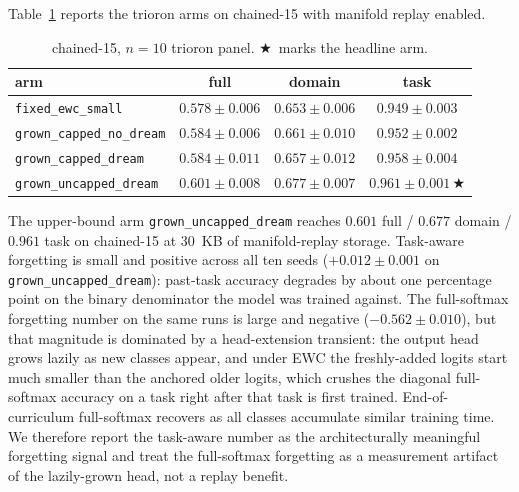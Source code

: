 \documentclass[11pt]{article}
\newcommand{\arm}[1]{\texttt{#1}}
\newcommand{\headline}{$\bigstar$}
\begin{document}
Table~\ref{tab:trioron-panel} reports the trioron arms on chained-15
with manifold replay enabled.

\begin{table}[h]
  \centering
  \caption{chained-15, $n = 10$ trioron panel.
           \headline\ marks the headline arm.}
  \label{tab:trioron-panel}
  \begin{tabular}{lccc}
    \toprule
    arm                              & full              & domain            & task              \\
    \midrule
    \arm{fixed\_ewc\_small}          & $0.578 \pm 0.006$ & $0.653 \pm 0.006$ & $0.949 \pm 0.003$ \\
    \arm{grown\_capped\_no\_dream}   & $0.584 \pm 0.006$ & $0.661 \pm 0.010$ & $0.952 \pm 0.002$ \\
    \arm{grown\_capped\_dream}       & $0.584 \pm 0.011$ & $0.657 \pm 0.012$ & $0.958 \pm 0.004$ \\
    \arm{grown\_uncapped\_dream}     & $0.601 \pm 0.008$ & $0.677 \pm 0.007$ & $0.961 \pm 0.001$\,\headline \\
    \bottomrule
  \end{tabular}
\end{table}

The upper-bound arm \arm{grown\_uncapped\_dream} reaches $0.601$ full /
$0.677$ domain / $0.961$ task on chained-15 at 30~KB of manifold-replay
storage. Task-aware forgetting is small and positive across all ten
seeds ($+0.012 \pm 0.001$ on \arm{grown\_uncapped\_dream}): past-task
accuracy degrades by about one percentage point on the binary
denominator the model was trained against. The full-softmax forgetting
number on the same runs is large and negative ($-0.562 \pm 0.010$),
but that magnitude is dominated by a head-extension transient: the
output head grows lazily as new classes appear, and under EWC the
freshly-added logits start much smaller than the anchored older
logits, which crushes the diagonal full-softmax accuracy on a task
right after that task is first trained. End-of-curriculum full-softmax
recovers as all classes accumulate similar training time. We therefore
report the task-aware number as the architecturally meaningful
forgetting signal and treat the full-softmax forgetting as a
measurement artifact of the lazily-grown head, not a replay benefit.
\end{document}
